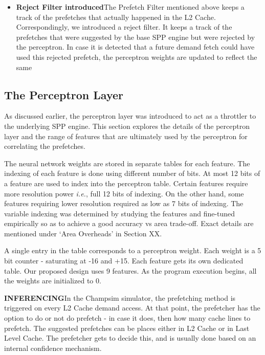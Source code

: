\begin{itemize}
\item \textbf{Reject Filter introduced}\newline The Prefetch Filter
  mentioned above keeps a track of the prefetches that actually
  happened in the L2 Cache.  Correspondingly, we introduced a reject
  filter.  It keeps a track of the prefetches that were suggested by
  the base SPP engine but were rejected by the perceptron.  In case it
  is detected that a future demand fetch could have used this rejected
  prefetch, the perceptron weights are updated to reflect the same

\end{itemize}

\subsection{The Perceptron Layer}
As discussed earlier, the perceptron layer was introduced to act as a
throttler to the underlying SPP engine.  This section explores the
details of the perceptron layer and the range of features that are
ultimately used by the perceptron for correlating the prefetches.

The neural network weights are stored in separate tables for each
feature.  The indexing of each feature is done using different number
of bits.  At most 12 bits of a feature are used to index into the
perceptron table.  Certain features require more resolution power
\textit{i.e.}, full 12 bits of indexing.  On the other hand, some
features requiring lower resolution required as low as 7 bits of
indexing.  The variable indexing was determined by studying the
features and fine-tuned empirically so as to achieve a good accuracy
vs area trade-off.  Exact details are mentioned under `Area Overheads'
in Section XX.

A single entry in the table corresponds to a perceptron weight.  Each
weight is a 5 bit counter - saturating at -16 and +15.  Each feature
gets its own dedicated table.  Our proposed design uses 9 features.
As the program execution begins, all the weights are initialized to 0.

\textbf{INFERENCING}\newline In the Champsim simulator, the
prefetching method is triggered on every L2 Cache demand access.  At
that point, the prefetcher has the option to do or not do prefetch -
in case it does, then how many cache lines to prefetch.  The suggested
prefetches can be places either in L2 Cache or in Last Level Cache.
The prefetcher gets to decide this, and is usually done based on an
internal confidence mechanism.

